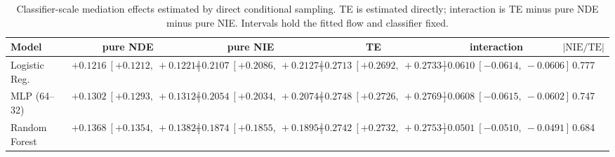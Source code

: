\begin{table}[htbp]
  \centering
  \caption{Classifier-scale mediation effects estimated by direct conditional sampling. TE is estimated directly; interaction is TE minus pure NDE minus pure NIE. Intervals hold the fitted flow and classifier fixed.}
  \label{tab:bar_gap_overall}
  \begin{tabular}{lccccc}
    \toprule
    Model & pure NDE & pure NIE & TE & interaction & $|\mathrm{NIE}/\mathrm{TE}|$ \\
    \midrule
    Logistic Reg. & $+0.1216\ [+0.1212,\ +0.1221]$ & $+0.2107\ [+0.2086,\ +0.2127]$ & $+0.2713\ [+0.2692,\ +0.2733]$ & $-0.0610\ [-0.0614,\ -0.0606]$ & 0.777 \\
    MLP (64--32) & $+0.1302\ [+0.1293,\ +0.1312]$ & $+0.2054\ [+0.2034,\ +0.2074]$ & $+0.2748\ [+0.2726,\ +0.2769]$ & $-0.0608\ [-0.0615,\ -0.0602]$ & 0.747 \\
    Random Forest & $+0.1368\ [+0.1354,\ +0.1382]$ & $+0.1874\ [+0.1855,\ +0.1895]$ & $+0.2742\ [+0.2732,\ +0.2753]$ & $-0.0501\ [-0.0510,\ -0.0491]$ & 0.684 \\
    \bottomrule
  \end{tabular}
\end{table}
